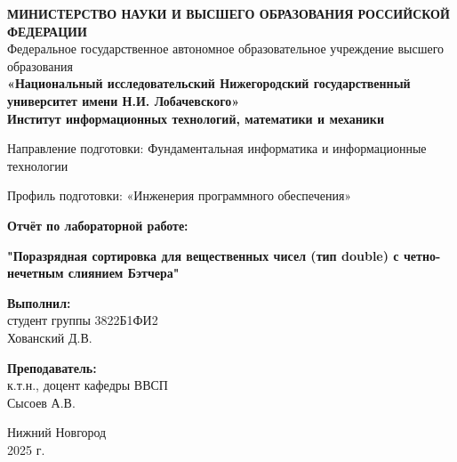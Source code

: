 \documentclass[12pt]{article}
\begin{document}
\begin{titlepage}
	\begin{center}

		\onehalfspacing

		\begin{center}
			\textbf{МИНИСТЕРСТВО НАУКИ И ВЫСШЕГО ОБРАЗОВАНИЯ РОССИЙСКОЙ ФЕДЕРАЦИИ} \\ 			
			\vspace{0.5cm}
			Федеральное государственное автономное образовательное учреждение высшего образования \\ 
			\vspace{0.5cm}
			\textbf{«Национальный исследовательский Нижегородский государственный университет имени Н.И. Лобачевского»} \\
			\vspace{0.5cm}
			\textbf{Институт информационных технологий, математики и механики}
		\end{center}
		\vspace{0.5cm}
		\begin{center}
		Направление подготовки: Фундаментальная информатика и информационные технологии


		Профиль подготовки: «Инженерия программного обеспечения»
		\end{center}
		\vspace{3.5cm}
		\begin{center}
			\textbf{Отчёт по лабораторной работе:}

			\textbf{"Поразрядная сортировка для вещественных чисел (тип double) с четно-нечетным слиянием Бэтчера"}
		\end{center}

		\vspace{3.5cm}

		\begin{flushright}
			\textbf{Выполнил:} \\
			студент группы 3822Б1ФИ2 \\
			Хованский Д.В. \\

			\vspace{1cm}

		\noindent\textbf{Преподаватель:} \\
		к.т.н., доцент кафедры ВВСП \\
		{Сысоев А.В.}
		\end{flushright}

		\vspace{2em}

		\vfill

		\begin{center}
			Нижний Новгород \\
			2025 г.
		\end{center}

	\end{center}
\end{titlepage}
\end{document}
